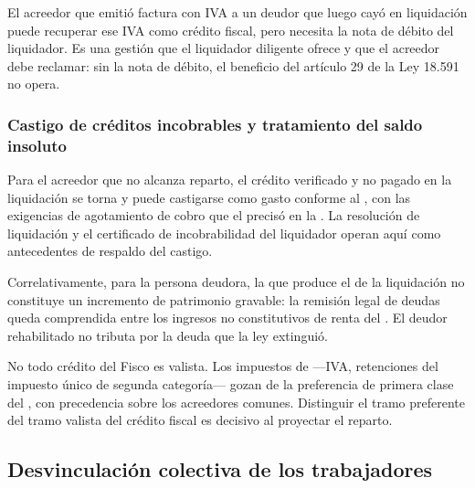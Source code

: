 \begin{foco}
El acreedor que emitió factura con IVA a un deudor que luego cayó en liquidación puede
recuperar ese IVA como crédito fiscal, pero necesita la nota de débito del liquidador. Es una
gestión que el liquidador diligente ofrece y que el acreedor debe reclamar: sin la nota de
débito, el beneficio del artículo 29 de la Ley 18.591 no opera.
\end{foco}

\subsubsection{Castigo de créditos incobrables y tratamiento del saldo insoluto}

Para el acreedor que no alcanza reparto, el crédito verificado y no pagado en la liquidación se
torna  y puede castigarse como gasto conforme al , con las
exigencias de agotamiento de cobro que el \sii{} precisó en la \textcite{circular-sii-62-2016}.
La resolución de liquidación y el certificado de incobrabilidad del liquidador operan aquí como
antecedentes de respaldo del castigo.

Correlativamente, para la persona deudora, la  que
produce el \discharge{} de la liquidación no constituye un incremento de patrimonio gravable:
la remisión legal de deudas queda comprendida entre los ingresos no constitutivos de renta del
. El deudor rehabilitado no tributa por la deuda que la ley extinguió.

\begin{practica}
No todo crédito del Fisco es valista. Los impuestos de  ---IVA,
retenciones del impuesto único de segunda categoría--- gozan de la preferencia de primera clase
del  , con precedencia sobre los acreedores comunes. Distinguir el tramo
preferente del tramo valista del crédito fiscal es decisivo al proyectar el reparto.
\end{practica}

\bloquePractico

\subsection{Desvinculación colectiva de los trabajadores}

